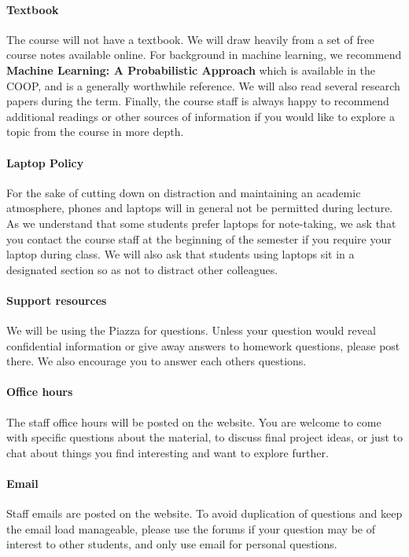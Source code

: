 \documentclass[11pt]{article}
\begin{document}
\paragraph{Textbook}

The course will not have a textbook. We will draw heavily from a set
of free course notes available online. For background in machine
learning, we recommend \textbf{Machine Learning: A Probabilistic
  Approach} which is available in the COOP, and is a generally
worthwhile reference. We will also read several research papers during
the term.  Finally, the course staff is always happy to recommend
additional readings or other sources of information if you would like
to explore a topic from the course in more depth.

\paragraph{Laptop Policy}

For the sake of cutting down on distraction and maintaining an
academic atmosphere, phones and laptops will in general not be
permitted during lecture. As we understand that some students prefer
laptops for note-taking, we ask that you contact the course staff at
the beginning of the semester if you require your laptop during
class. We will also ask that students using laptops sit in a designated
section so as not to distract other colleagues.

\paragraph{Support resources}

We will be using the Piazza for questions. Unless your question would
reveal confidential information or give away answers to homework
questions, please post there. We also encourage you to answer each
others questions.

\paragraph{Office hours} 
The staff office hours will be posted on the
website. You are welcome to come with specific questions about the
material, to discuss final project ideas, or just to chat about things
you find interesting and want to explore further.

\paragraph{Email} Staff emails are posted on the website. To avoid
duplication of questions and keep the email load manageable, please
use the forums if your question may be of interest to other students,
and only use email for personal questions.
\end{document}
